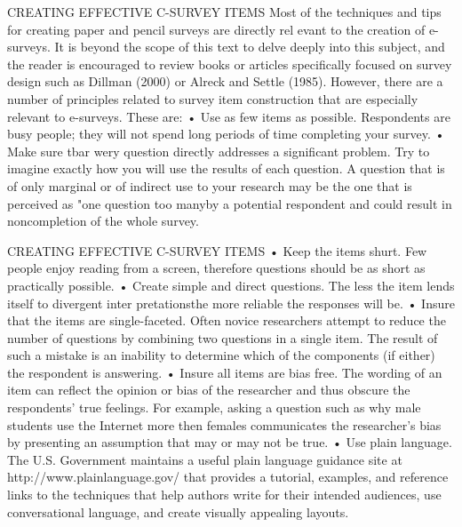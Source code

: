 \documentclass{beamer}
\begin{document}
\begin{frame}{CREATING EFFECTIVE C-SURVEY ITEMS}
Most of the techniques and tips for creating paper and pencil surveys are directly rel evant to the creation of e-surveys. 
It is beyond the scope of this text to delve deeply into this subject, and the reader is encouraged to review books or articles 
specifically focused on survey design such as Dillman (2000) or Alreck and Settle (1985). 
However, there are a number of principles related to survey item construction that are especially relevant to e-surveys. 
These are: 
• Use as few items as possible. Respondents are busy people; they will not spend long 
periods of time completing your survey. 
• Make sure tbar wery question directly addresses a significant problem. Try to imagine exactly 
how you will use the results of each question. A question that is of only marginal or 
of indirect use to your research may be the one that is perceived as "one question too manyby 
a potential respondent and could result in noncompletion of the whole survey. 

\end{frame}	
\begin{frame}{CREATING EFFECTIVE C-SURVEY ITEMS}
• Keep the items shurt. Few people enjoy reading from a screen, therefore 
questions should be as short as practically possible. 
• Create simple and direct questions. The less the item lends itself to 
divergent inter pretationsthe more reliable the responses will be. 
• Insure that the items are single-faceted. Often novice researchers attempt 
to reduce the number of questions by combining two questions in a single item. 
The result of such a mistake is an inability to determine which of the components 
(if either) the respondent is answering. 
• Insure all items are bias free. The wording of an item can reflect the opinion 
or bias of the researcher and thus obscure the respondents' true feelings. For example, 
asking a question such as why male students use the Internet more then females 
communicates the researcher's bias by presenting an assumption that may or may not be true. 
• Use plain language. The U.S. Government maintains a useful plain language guidance 
site at http://www.plainlanguage.gov/ that provides a tutorial, examples, and reference 
links to the techniques that help authors write for their intended audiences, use 
conversational language, and create visually appealing layouts. 
\end{frame}
\end{document}
